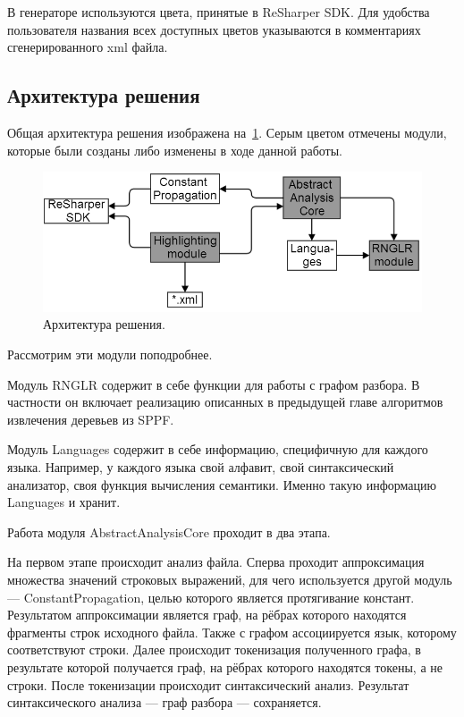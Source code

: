 В генераторе используются цвета, принятые в ReSharper SDK. Для удобства пользователя названия всех доступных цветов указываются в комментариях сгенерированного xml файла. 
\subsection{Архитектура решения}

Общая архитектура решения изображена на~\ref{architecture}. Серым цветом отмечены модули, которые были созданы либо изменены в ходе данной работы.

\begin{figure}[t]
\centering
\includegraphics[width=\linewidth]{Ivanov/Pictures/architecture.png}
\caption{Архитектура решения.}
\label{architecture}
\end{figure}

Рассмотрим эти модули поподробнее. 

Модуль RNGLR содержит в себе функции для работы с графом разбора. В частности он включает реализацию описанных в предыдущей главе алгоритмов извлечения деревьев из SPPF. 

Модуль Languages содержит в себе информацию, специфичную для каждого языка. Например, у каждого языка свой алфавит, свой синтаксический анализатор, своя функция вычисления семантики. Именно такую информацию Languages и хранит. 

Работа модуля AbstractAnalysisCore проходит в два этапа. 

На первом этапе происходит анализ файла. Сперва проходит аппроксимация множества значений строковых выражений, для чего используется другой модуль --- ConstantPropagation, целью которого является протягивание констант. Результатом аппроксимации является граф, на рёбрах которого находятся фрагменты строк исходного файла. Также с графом ассоциируется язык, которому соответствуют строки. Далее происходит токенизация полученного графа, в результате которой получается граф, на рёбрах которого находятся токены, а не строки. После токенизации происходит синтаксический анализ. Результат синтаксического анализа --- граф разбора --- сохраняется. 

